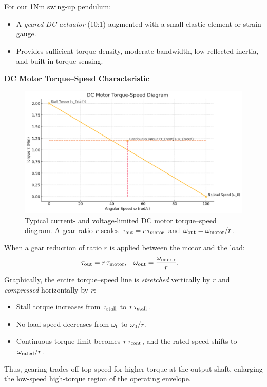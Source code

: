 \documentclass[12pt,a4paper]{article}
\begin{document}
For our 1Nm swing-up pendulum:
\begin{itemize}
  \item A \emph{geared DC actuator} (10:1) augmented with a small elastic element or strain gauge.
  \item Provides sufficient torque density, moderate bandwidth, low reflected inertia, and built-in torque sensing.
\end{itemize}

\textbf{DC Motor Torque–Speed Characteristic}

\begin{figure}[htbp]
  \centering
  \includegraphics[width=0.9\linewidth]{../figs/output.png}
  \caption{Typical current- and voltage-limited DC motor torque–speed diagram.  
  A gear ratio $r$ scales $\tau_{\rm out} = r\,\tau_{\rm motor}$ and $\omega_{\rm out} = \omega_{\rm motor}/r$.}
  \label{fig:torque_speed}
\end{figure}
When a gear reduction of ratio \(r\) is applied between the motor and the load:
\begin{align*}
  \tau_{\rm out} &= r \,\tau_{\rm motor},   &
  \omega_{\rm out} &= \frac{\omega_{\rm motor}}{r}.
\end{align*}
Graphically, the entire torque–speed line is \emph{stretched} vertically by \(r\) and \emph{compressed} horizontally by \(r\):
\begin{itemize}
  \item Stall torque increases from \(\tau_{\rm stall}\) to \(r\,\tau_{\rm stall}\).
  \item No-load speed decreases from \(\omega_0\) to \(\omega_0/r\).
  \item Continuous torque limit becomes \(r\,\tau_{\rm cont}\), and the rated speed shifts to \(\omega_{\rm rated}/r\).
\end{itemize}
Thus, gearing trades off top speed for higher torque at the output shaft, enlarging the low-speed high-torque region of the operating envelope.
\end{document}
